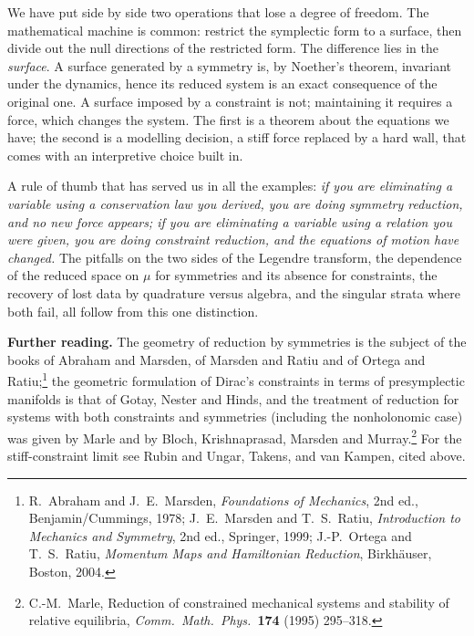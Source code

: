 We have put side by side two operations that lose a degree of freedom. The mathematical machine is common: restrict the symplectic form to a surface, then divide out the null directions of the restricted form. The difference lies in the \emph{surface}. A surface generated by a symmetry is, by Noether's theorem, invariant under the dynamics, hence its reduced system is an exact consequence of the original one. A surface imposed by a constraint is not; maintaining it requires a force, which changes the system. The first is a theorem about the equations we have; the second is a modelling decision, a stiff force replaced by a hard wall, that comes with an interpretive choice built in.

A rule of thumb that has served us in all the examples: \emph{if you are eliminating a variable using a conservation law you derived, you are doing symmetry reduction, and no new force appears; if you are eliminating a variable using a relation you were given, you are doing constraint reduction, and the equations of motion have changed.} The pitfalls on the two sides of the Legendre transform, the dependence of the reduced space on $\mu$ for symmetries and its absence for constraints, the recovery of lost data by quadrature versus algebra, and the singular strata where both fail, all follow from this one distinction.

\medskip
\noindent\textbf{Further reading.} The geometry of reduction by symmetries is the subject of the books of Abraham and Marsden, of Marsden and Ratiu and of Ortega and Ratiu;\footnote{R.\ Abraham and J.\ E.\ Marsden, \emph{Foundations of Mechanics}, 2nd ed., Benjamin/Cummings, 1978; J.\ E.\ Marsden and T.\ S.\ Ratiu, \emph{Introduction to Mechanics and Symmetry}, 2nd ed., Springer, 1999; J.-P.\ Ortega and T.\ S.\ Ratiu, \emph{Momentum Maps and Hamiltonian Reduction}, Birkh\"auser, Boston, 2004.} the geometric formulation of Dirac's constraints in terms of presymplectic manifolds is that of Gotay, Nester and Hinds, and the treatment of reduction for systems with both constraints and symmetries (including the nonholonomic case) was given by Marle and by Bloch, Krishnaprasad, Marsden and Murray.\footnote{C.-M.\ Marle, Reduction of constrained mechanical systems and stability of relative equilibria, \emph{Comm.\ Math.\ Phys.}\ \textbf{174} (1995) 295--318.} For the stiff-constraint limit see Rubin and Ungar, Takens, and van Kampen, cited above.
